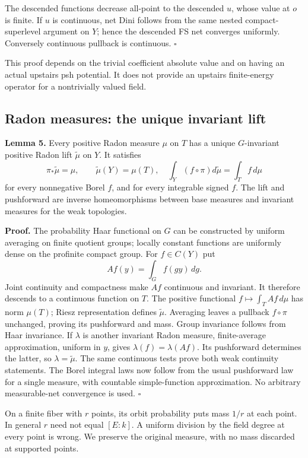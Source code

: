 \documentclass[
  11pt,
]{article}
\begin{document}
The descended functions decrease all-point to the descended \(u\), whose
value at \(o\) is finite. If \(u\) is continuous, net Dini follows from
the same nested compact-superlevel argument on \(Y\); hence the
descended FS net converges uniformly. Conversely continuous pullback is
continuous. \(\square\)

This proof depends on the trivial coefficient absolute value and on
having an actual upstairs psh potential. It does not provide an upstairs
finite-energy operator for a nontrivially valued field.

\subsection{Radon measures: the unique invariant
lift}\label{radon-measures-the-unique-invariant-lift}

\textbf{Lemma 5.} Every positive Radon measure \(\mu\) on \(T\) has a
unique \(G\)-invariant positive Radon lift \(\widetilde\mu\) on \(Y\).
It satisfies \[
 \pi_*\widetilde\mu=\mu,\qquad \widetilde\mu(Y)=\mu(T),
 \quad\int_Y(f\circ\pi)d\widetilde\mu=\int_T f\,d\mu
 \tag{8}
\] for every nonnegative Borel \(f\), and for every integrable signed
\(f\). The lift and pushforward are inverse homeomorphisms between base
measures and invariant measures for the weak topologies.

\textbf{Proof.} The probability Haar functional on \(G\) can be
constructed by uniform averaging on finite quotient groups; locally
constant functions are uniformly dense on the profinite compact group.
For \(f\in C(Y)\) put \[
 Af(y)=\int_G f(gy)\,dg.
\] Joint continuity and compactness make \(Af\) continuous and
invariant. It therefore descends to a continuous function on \(T\). The
positive functional \(f\mapsto\int_T Af\,d\mu\) has norm \(\mu(T)\);
Riesz representation defines \(\widetilde\mu\). Averaging leaves a
pullback \(f\circ\pi\) unchanged, proving its pushforward and mass.
Group invariance follows from Haar invariance. If \(\lambda\) is another
invariant Radon measure, finite-average approximation, uniform in \(y\),
gives \(\lambda(f)=\lambda(Af)\). Its pushforward determines the latter,
so \(\lambda=\widetilde\mu\). The same continuous tests prove both weak
continuity statements. The Borel integral laws now follow from the usual
pushforward law for a single measure, with countable simple-function
approximation. No arbitrary measurable-net convergence is used.
\(\square\)

On a finite fiber with \(r\) points, its orbit probability puts mass
\(1/r\) at each point. In general \(r\) need not equal \([E:k]\). A
uniform division by the field degree at every point is wrong. We
preserve the original measure, with no mass discarded at supported
points.
\end{document}
